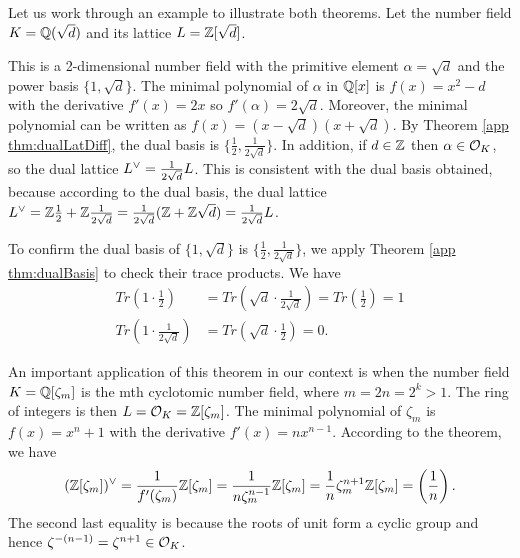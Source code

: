 \documentclass[../main.tex]{subfiles}
\begin{document}
\begin{example}
Let us work through an example to illustrate both theorems. Let the number field $K=\mathbb{Q}(\sqrt{d})$ and its lattice $L=\mathbb{Z}[\sqrt{d}]$.   

This is a 2-dimensional number field with the primitive element $\alpha = \sqrt{d}$ and the power basis $\{1, \sqrt{d}\}$. The minimal polynomial of $\alpha$ in $\mathbb{Q}[x]$ is $f(x) = x^2-d$ with the derivative $f'(x) = 2x$ so $f'(\alpha)=2\sqrt{d}$. Moreover, the minimal polynomial can be written as $f(x) = (x-\sqrt{d})(x+\sqrt{d})$. By Theorem \ref{app thm:dualLatDiff}, the dual basis is $\{\frac{1}{2}, \frac{1}{2\sqrt{d}}\}$. In addition, if $d \in \mathbb{Z}$ then $\alpha \in \mathcal{O}_K$, so the dual lattice $L^{\vee} = \frac{1}{2\sqrt{d}}L$. This is consistent with the dual basis obtained, because according to the dual basis, the dual lattice $L^{\vee} = \mathbb{Z} \frac{1}{2}+\mathbb{Z} \frac{1}{2\sqrt{d}}= \frac{1}{2\sqrt{d}}(\mathbb{Z}+\mathbb{Z} \sqrt{d})=\frac{1}{2\sqrt{d}} L$.

To confirm the dual basis of $\{1, \sqrt{d}\}$ is $\{\frac{1}{2}, \frac{1}{2\sqrt{d}}\}$, we apply Theorem \ref{app thm:dualBasis} to check their trace products. We have 
\begin{align*}
    Tr(1 \cdot \frac{1}{2}) &= Tr(\sqrt{d} \cdot \frac{1}{2\sqrt{d}}) = Tr(\frac{1}{2}) = 1 \\
    Tr(1 \cdot \frac{1}{2\sqrt{d}}) &= Tr(\sqrt{d} \cdot \frac{1}{2}) = 0.
\end{align*}
\end{example}

\begin{example}
An important application of this theorem in our context is when the number field $K=\mathbb{Q}[\zeta_m]$ is the mth cyclotomic number field, where $m=2n=2^k>1$. The ring of integers is then $L=\mathcal{O}_K=\mathbb{Z}[\zeta_m]$. The minimal polynomial of $\zeta_m$ is $f(x)=x^n+1$ with the derivative $f'(x)=nx^{n-1}$. According to the theorem, we have 
\begin{equation*}
    (\mathbb{Z}[\zeta_m])^{\vee} = \frac{1}{f'(\zeta_m)} \mathbb{Z}[\zeta_m] = \frac{1}{n\zeta_m^{n-1}} \mathbb{Z}[\zeta_m] = \frac{1}{n} \zeta_m^{n+1} \mathbb{Z}[\zeta_m]= \left(\frac{1}{n}\right).
\end{equation*}
The second last equality is because the roots of unit form a cyclic group and hence $\zeta^{-(n-1)}=\zeta^{n+1} \in \mathcal{O}_K$. 
\end{example}
\end{document}
